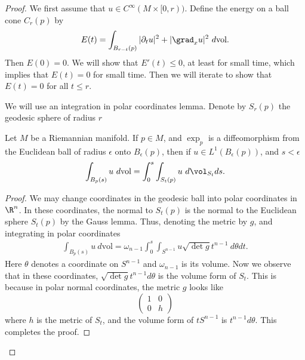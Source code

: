 \documentclass[12pt]{article}
\begin{document}
\begin{proof}
We first assume that $u \in C^\infty(M\times [0,r))$. Define the energy on a ball cone $C_r(p)$ by
\[E(t) = \int_{B_{r-t}(p)}|\partial_t u|^2 + |\grad_x u|^2\ d\text{vol}.\] Then $E(0) = 0$. We will show that $E'(t) \leq 0$, at least for small time, which implies that $E(t) = 0$ for small time. Then we will iterate to show that $E(t) = 0$ for all $t \leq r$.

We will use an integration in polar coordinates lemma. Denote by $S_r(p)$ the geodesic sphere of radius $r$
\begin{lem}Let $M$ be a Riemannian manifold. If $p \in M$, and $\exp_p$ is a diffeomorphism from the Euclidean ball of radius $\epsilon$ onto $B_\epsilon(p)$, then if $u \in L^1(B_\epsilon(p))$, and $s < \epsilon$
\[\int_{B_p(s)} u\ d\text{vol} = \int_0^s\int_{S_t(p)}u\ d\vol_{S_{t}}ds.\]\end{lem}
\begin{proof}We may change coordinates in the geodesic ball into polar coordinates in $\R^n$. In these coordinates, the normal to $S_t(p)$ is the normal to the Euclidean sphere $S_t(p)$ by the Gauss lemma. Thus, denoting the metric by $g$, and integrating in polar coordinates
\begin{align*}
\int_{B_p(s)} u\ d\text{vol} = \omega_{n-1}\int_{0}^s\int_{S^{n-1}}u\sqrt{\det g}t^{n-1}\ d\theta dt.\end{align*}
Here $\theta$ denotes a coordinate on $S^{n-1}$ and $\omega_{n-1}$ is its volume. Now we observe that in these coordinates, $\sqrt{\det g}t^{n-1}d\theta$ is the volume form of $S_{t}$. This is because in polar normal coordinates, the metric $g$ looks like
\[\begin{pmatrix}1&0\\
0&h\end{pmatrix}\]
where $h$ is the metric of $S_{t}$, and the volume form of $tS^{n-1}$ is $t^{n-1}d\theta$. This completes the proof.\end{proof}


\end{proof}
\end{document}
